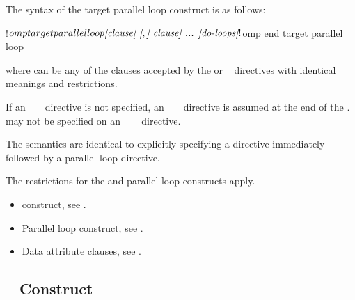 \begin{fortranspecific}
The syntax of the target parallel loop construct is as follows:

\begin{ompfPragma}
!$omp target parallel loop \plc{[clause[ [},\plc{] clause] ... ]}
    \plc{do-loops}
\plc{[}!$omp end target parallel loop\plc{]}
\end{ompfPragma}

where  can be any of the clauses accepted by the  or ~
directives with identical meanings and restrictions.

If an ~ ~ directive is not specified, an
~ ~ directive is assumed at the end of the
.
 may not be specified on an ~~~ directive.
\end{fortranspecific}

\descr
The semantics are identical to explicitly specifying a  directive immediately
followed by a parallel loop directive.

\restrictions
The restrictions for the  and parallel loop constructs apply.

\crossreferences
\begin{itemize}
\item {} construct, see .

\item Parallel loop construct, see
.

\item Data attribute clauses, see .
\end{itemize}









\subsection{~ Construct}
\label{subsec:target simd Construct}

